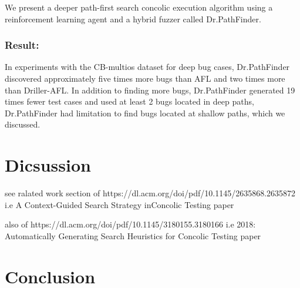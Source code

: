 \documentclass[	runningheads,
				a4paper]{llncs}
\begin{document}
We present a deeper path-first search concolic execution algorithm using a reinforcement learning agent and
a hybrid fuzzer called Dr.PathFinder.

\subsubsection{Result:}
In experiments with the CB-multios dataset for deep bug cases, Dr.PathFinder discovered approximately five
times more bugs than AFL and two times more than Driller-AFL. In addition to finding more bugs, Dr.PathFinder
generated 19 times fewer test cases and used at least 2%
bugs located in deep paths, Dr.PathFinder had limitation to find bugs located at shallow paths, which we discussed.


\section{Dicsussion}
see ralated work section of https://dl.acm.org/doi/pdf/10.1145/2635868.2635872
i.e A Context-Guided Search Strategy inConcolic Testing paper

also of https://dl.acm.org/doi/pdf/10.1145/3180155.3180166
i.e 2018: Automatically Generating Search Heuristics for Concolic Testing paper


\section{Conclusion}







	
\end{document}
